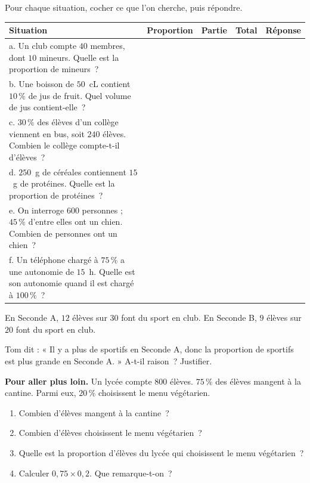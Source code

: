 \documentclass[a4paper,11pt,fleqn]{article}
\renewcommand{\arraystretch}{1.5}
\newcommand{\ligne}{\par\smallskip\makebox[\linewidth]{\dotfill}\par}
\begin{document}
\begin{EXO}{}{}
Pour chaque situation, cocher ce que l'on cherche, puis répondre.

\begin{center}
\renewcommand{\arraystretch}{1.6}
\begin{tabular}{|p{9.2cm}|C{1.7cm}|C{1.2cm}|C{1.2cm}|C{2.6cm}|}
	\hline
	\textbf{Situation} & \textbf{Propor\-tion} & \textbf{Partie} & \textbf{Total} & \textbf{Réponse} \\ \hline
	a. Un club compte $40$ membres, dont $10$ mineurs. Quelle est la proportion de mineurs~? & & & & \\ \hline
	b. Une boisson de $50$~cL contient $10\,\%$ de jus de fruit. Quel volume de jus contient-elle~? & & & & \\ \hline
	c. $30\,\%$ des élèves d'un collège viennent en bus, soit $240$ élèves. Combien le collège compte-t-il d'élèves~? & & & & \\ \hline
	d. $250$~g de céréales contiennent $15$~g de protéines. Quelle est la proportion de protéines~? & & & & \\ \hline
	e. On interroge $600$ personnes ; $45\,\%$ d'entre elles ont un chien. Combien de personnes ont un chien~? & & & & \\ \hline
	f. Un téléphone chargé à $75\,\%$ a une autonomie de $15$~h. Quelle est son autonomie quand il est chargé à $100\,\%$~? & & & & \\ \hline
\end{tabular}
\end{center}
\end{EXO}

\begin{EXO}{}{}
En Seconde A, $12$ élèves sur $30$ font du sport en club. En Seconde B, $9$ élèves sur $20$ font du sport en club.

Tom dit : « Il y a plus de sportifs en Seconde A, donc la proportion de sportifs est plus grande en Seconde A. » A-t-il raison~? Justifier.
\ligne\ligne\ligne
\end{EXO}

\begin{EXO}{}{}
\textbf{Pour aller plus loin.} Un lycée compte $800$ élèves. $75\,\%$ des élèves mangent à la cantine. Parmi eux, $20\,\%$ choisissent le menu végétarien.
\begin{enumerate}[itemsep=0.3em]
	\item Combien d'élèves mangent à la cantine~?
	\ligne\ligne
	\item Combien d'élèves choisissent le menu végétarien~?
	\ligne\ligne
	\item Quelle est la proportion d'élèves du lycée qui choisissent le menu végétarien~?
	\ligne\ligne
	\item Calculer $0{,}75 \times 0{,}2$. Que remarque-t-on~?
	\ligne\ligne
\end{enumerate}
\end{EXO}
\end{document}
